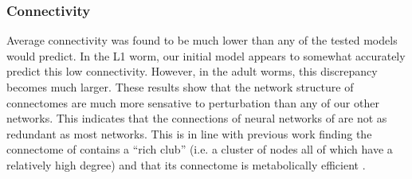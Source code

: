 \subsubsection{Connectivity} Average connectivity was found to be much lower than any of the tested models would predict. 
In the L1 worm, our initial model appears to somewhat accurately predict this low connectivity. 
However, in the adult worms, this discrepancy becomes much larger. 
These results show that the network structure of \ce connectomes are much more sensative to perturbation than any of our other networks.
This indicates that the connections of neural networks of \ce are not as redundant as most networks. 
This is in line with previous work finding the connectome of \ce contains a ``rich club'' (i.e. a cluster of nodes all of which have a relatively high degree) and that its connectome is metabolically efficient \citep{PerezEscudero, Towlson}.